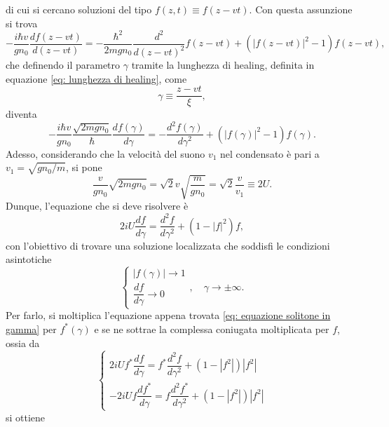 di cui si cercano soluzioni del tipo $f(z,t) \equiv f(z - vt)$. Con questa assunzione si trova
\begin{equation}
    -\frac{i\hbar v}{gn_0}\frac{df(z - vt)}{d(z - vt)} = -\frac{\hbar^2}{2mgn_0}\frac{d^2}{d(z - vt)^2}f(z - vt) + (|f(z - vt)|^2 - 1)f(z - vt),
\end{equation}
che definendo il parametro $\gamma$ tramite la lunghezza di healing, definita in equazione \eqref{eq: lunghezza di healing}, come
\begin{equation}
    \gamma \equiv \frac{z - vt}{\xi},
\end{equation}
diventa 
\begin{equation}
    -\frac{i\hbar v}{gn_0}\frac{\sqrt{2mgn_0}}{\hbar}\frac{df(\gamma)}{d\gamma} = -\frac{d^2f(\gamma)}{d\gamma^2} + (|f(\gamma)|^2 - 1)f(\gamma).
\end{equation}
Adesso, considerando che la velocità del suono $v_1$ nel condensato è pari a $v_1 = \sqrt{gn_0/m}$, si pone 
\begin{equation}
    \frac{v}{gn_0}\sqrt{2mgn_0} = \sqrt{2}v\sqrt{\frac{m}{gn_0}} = \sqrt{2}\frac{v}{v_1} \equiv 2U.
\end{equation}
Dunque, l'equazione che si deve risolvere è
\begin{equation}
\label{eq: equazione solitone in gamma}
    2iU\frac{df}{d\gamma} = \frac{d^2f}{d\gamma^2} + (1 - |f|^2)f,
\end{equation}
con l'obiettivo di trovare una soluzione localizzata che soddisfi le condizioni asintotiche
\begin{equation}
\label{eq: condizioni al bordo del solitone}
    \begin{cases}
        |f(\gamma)| \to 1 \\[2ex]
        \dfrac{df}{d\gamma} \to 0
    \end{cases},\quad \gamma \to \pm\infty.
\end{equation}
Per farlo, si moltiplica l'equazione appena trovata \eqref{eq: equazione solitone in gamma} per $f^*(\gamma)$ e se ne sottrae la complessa coniugata moltiplicata per $f$, ossia da 
\begin{equation}
    \begin{cases}
        2iUf^*\dfrac{df}{d\gamma} = f^*\dfrac{d^2f}{d\gamma^2} + (1 - |f^2|)|f^2| \\
        -2iUf\dfrac{df^*}{d\gamma} = f\dfrac{d^2f^*}{d\gamma^2} + (1 - |f^2|)|f^2|
    \end{cases}
\end{equation}
si ottiene
